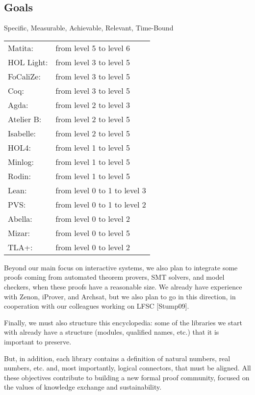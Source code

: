 \subsection{Goals}

Specific, Measurable, Achievable, Relevant, Time-Bound

\begin{tabular}{ll}
Matita:& from level 5 to level 6\\
HOL Light:& from level 3 to level 5\\
FoCaliZe:& from level 3 to level 5\\
Coq:& from level 3 to level 5\\
Agda:& from level 2 to level 3\\
Atelier B:& from level 2 to level 5\\
Isabelle:& from level 2 to level 5\\
HOL4:& from level 1 to level 5\\
Minlog:& from level 1 to level 5\\
Rodin:& from level 1 to level 5\\
Lean:& from level 0 to 1 to level 3\\
PVS:& from level 0 to 1 to level 2\\
Abella:& from level 0 to level 2\\
Mizar:& from level 0 to level 5\\
TLA+:& from level 0 to level 2
\end{tabular}


Beyond our main focus on interactive systems, we also plan to
integrate some proofs coming from automated theorem provers, SMT
solvers, and model checkers, when these proofs have a reasonable
size. We already have experience with Zenon, iProver, and Archsat, but
we also plan to go in this direction, in cooperation with our
colleagues working on LFSC [Stump09].

Finally, we must also structure this encyclopedia: some of the
libraries we start with already have a structure (modules, qualified
names, etc.) that it is important to preserve.

But, in addition, each library contains a definition of natural
numbers, real numbers, etc. and, most importantly, logical connectors,
that must be aligned.  All these objectives contribute to building a
new formal proof community, focused on the values of knowledge
exchange and sustainability.


